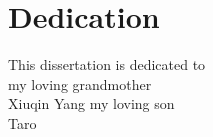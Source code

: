 \documentclass[12pt, letterpaper]{report}   %
\begin{document}


\maketitle

\copyrightpage

\approvalpage

\section*{Dedication}
\begin{flushright}
This dissertation is dedicated to \\
my loving grandmother \\ Xiuqin Yang 
my loving son \\ Taro 
\end{flushright}


\newpage
{}


\newpage
{}


\end{document}
